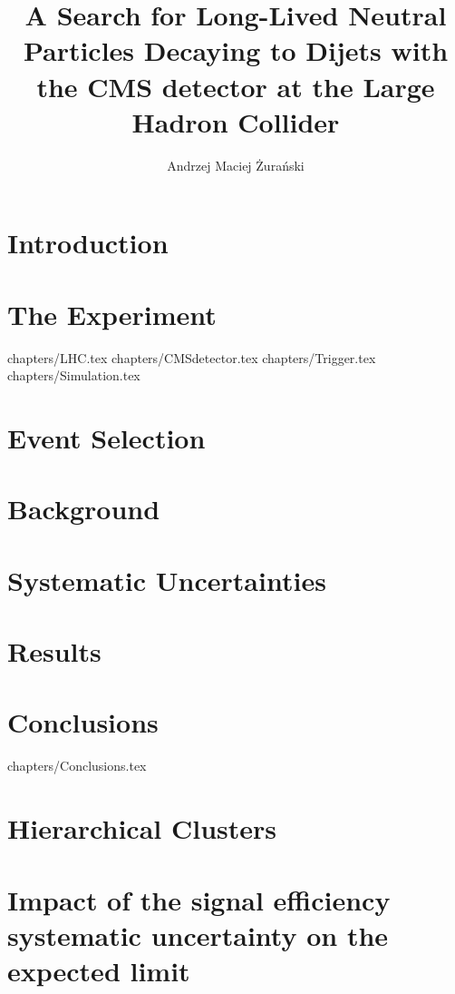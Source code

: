 \documentclass[phd,black]{PrincetonThesis}
\title{A Search for Long-Lived Neutral Particles Decaying to Dijets with the CMS detector at the
Large Hadron Collider}
\author{Andrzej Maciej \.Zura\'nski}
\begin{document}
\begin{frontmatter}
  \begin{thesisabstract}
    
  \end{thesisabstract}
  \begin{acknowledgements}
    
  \end{acknowledgements}
\end{frontmatter}


\chapter{Introduction}
\label{chap:intro}


\chapter{The Experiment}
\label{chap:cmslhc}
 {chapters/LHC.tex}
 {chapters/CMSdetector.tex}
 {chapters/Trigger.tex}
 {chapters/Simulation.tex}

\chapter{Event Selection}
\label{chap:selection}
 

\chapter{Background}
\label{chap:background}


\chapter{Systematic Uncertainties}
\label{chap:systematics}


\chapter{Results}
\label{chap:results}


\chapter{Conclusions}
 {chapters/Conclusions.tex}


\appendix
\chapter{Hierarchical Clusters}
\label{app:clusters}

\chapter{Impact of the signal efficiency systematic uncertainty on the expected limit}
\label{app:sys}


\cleardoublepage 
\end{document}
